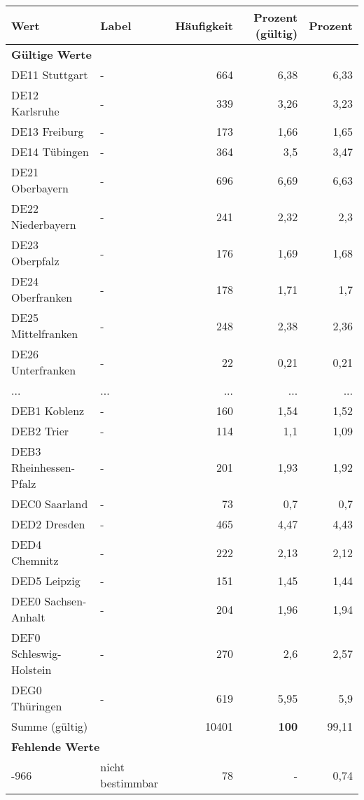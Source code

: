      \begin{longtable}{Xlrrr}
     \toprule
     \textbf{Wert} & \textbf{Label} & \textbf{Häufigkeit} & \textbf{Prozent (gültig)} & \textbf{Prozent} \\
     \endhead
     \midrule
     \multicolumn{5}{l}{\textbf{Gültige Werte}}\\
        \multicolumn{1}{X}{DE11 Stuttgart} & - & 664 & 6,38 & 6,33 \\
        \multicolumn{1}{X}{DE12 Karlsruhe} & - & 339 & 3,26 & 3,23 \\
        \multicolumn{1}{X}{DE13 Freiburg} & - & 173 & 1,66 & 1,65 \\
        \multicolumn{1}{X}{DE14 Tübingen} & - & 364 & 3,5 & 3,47 \\
        \multicolumn{1}{X}{DE21 Oberbayern} & - & 696 & 6,69 & 6,63 \\
        \multicolumn{1}{X}{DE22 Niederbayern} & - & 241 & 2,32 & 2,3 \\
        \multicolumn{1}{X}{DE23 Oberpfalz} & - & 176 & 1,69 & 1,68 \\
        \multicolumn{1}{X}{DE24 Oberfranken} & - & 178 & 1,71 & 1,7 \\
        \multicolumn{1}{X}{DE25 Mittelfranken} & - & 248 & 2,38 & 2,36 \\
        \multicolumn{1}{X}{DE26 Unterfranken} & - & 22 & 0,21 & 0,21 \\
       ... & ... & ... & ... & ... \\
        \multicolumn{1}{X}{DEB1 Koblenz} & - & 160 & 1,54 & 1,52 \\
        \multicolumn{1}{X}{DEB2 Trier} & - & 114 & 1,1 & 1,09 \\
        \multicolumn{1}{X}{DEB3 Rheinhessen-Pfalz} & - & 201 & 1,93 & 1,92 \\
        \multicolumn{1}{X}{DEC0 Saarland} & - & 73 & 0,7 & 0,7 \\
        \multicolumn{1}{X}{DED2 Dresden} & - & 465 & 4,47 & 4,43 \\
        \multicolumn{1}{X}{DED4 Chemnitz} & - & 222 & 2,13 & 2,12 \\
        \multicolumn{1}{X}{DED5 Leipzig} & - & 151 & 1,45 & 1,44 \\
        \multicolumn{1}{X}{DEE0 Sachsen-Anhalt} & - & 204 & 1,96 & 1,94 \\
        \multicolumn{1}{X}{DEF0 Schleswig-Holstein} & - & 270 & 2,6 & 2,57 \\
        \multicolumn{1}{X}{DEG0 Thüringen} & - & 619 & 5,95 & 5,9 \\
     \midrule
      \multicolumn{2}{l}{Summe (gültig)} & 10401 &
      \textbf{100} &
         99,11 \\
     \multicolumn{5}{l}{\textbf{Fehlende Werte}}\\
       -966 & nicht bestimmbar & 78 & - & 0,74 \\


\end{longtable}
